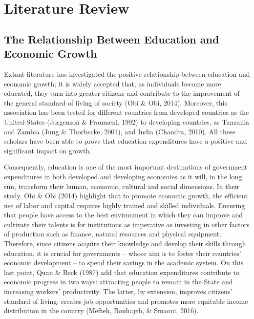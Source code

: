 \documentclass[
]{article}
\begin{document}
\hypertarget{literature-review}{%
\section{Literature Review}\label{literature-review}}

\hypertarget{the-relationship-between-education-and-economic-growth}{%
\subsection{The Relationship Between Education and Economic
Growth}\label{the-relationship-between-education-and-economic-growth}}

Extant literature has investigated the positive relationship between
education and economic growth; it is widely accepted that, as
individuals become more educated, they turn into greater citizens and
contribute to the improvement of the general standard of living of
society (Obi \& Obi, 2014). Moreover, this association has been tested
for different countries from developed countries as the United-States
(Jorgenson \& Fraumeni, 1992) to developing countries, as Tanzania and
Zambia (Jung \& Thorbecke, 2001), and India (Chandra, 2010). All these
scholars have been able to prove that education expenditures have a
positive and significant impact on growth.

Consequently, education is one of the most important destinations of
government expenditures in both developed and developing economies as it
will, in the long run, transform their human, economic, cultural and
social dimensions. In their study, Obi \& Obi (2014) highlight that to
promote economic growth, the efficient use of labor and capital requires
highly trained and skilled individuals. Ensuring that people have access
to the best environment in which they can improve and cultivate their
talents is for institutions as imperative as investing in other factors
of production such as finance, natural resources and physical equipment.
Therefore, since citizens acquire their knowledge and develop their
skills through education, it is crucial for governments -- whose aim is
to foster their countries' economic development -- to spend their
savings in the academic system. On this last point, Quan \& Beck (1987)
add that education expenditures contribute to economic progress in two
ways: attracting people to remain in the State and increasing workers'
productivity. The latter, by extension, improves citizens' standard of
living, creates job opportunities and promotes more equitable income
distribution in the country (Mefteh, Bouhajeb, \& Smaoui, 2016).
\end{document}
